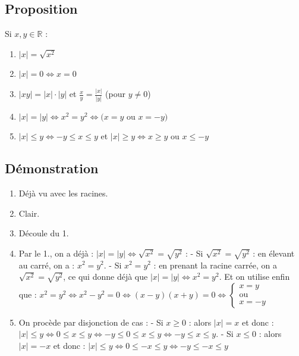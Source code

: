 \documentclass{article}
\begin{document}
	\subsection{Proposition }
	Si $x, y \in \mathbb{R}$ :
	\begin{enumerate}
		\item $|x| = \sqrt{x^2}$
		\item $|x| = 0 \Leftrightarrow x = 0$
		\item $|xy| = |x| \cdot |y|$ et $\frac{x}{y} = \frac{|x|}{|y|}$ (pour $y \neq 0$)
		\item $|x| = |y| \Leftrightarrow x^2 = y^2 \Leftrightarrow (x = y$ ou $x = -y)$
		\item $|x| \leq y \Leftrightarrow -y \leq x \leq y$ et $|x| \geq y \Leftrightarrow x \geq y$ ou $x \leq -y$
	\end{enumerate}
	
	\subsection{Démonstration}
	\begin{enumerate}
		\item Déjà vu avec les racines.
		\item Clair.
		\item Découle du 1.
		\item Par le 1., on a déjà : $|x| = |y| \Leftrightarrow \sqrt{x^2} = \sqrt{y^2}$ :
		- Si $\sqrt{x^2} = \sqrt{y^2}$ : en élevant au carré, on a : $x^2 = y^2$.
		- Si $x^2 = y^2$ : en prenant la racine carrée, on a $\sqrt{x^2} = \sqrt{y^2}$, ce qui donne déjà que $|x| = |y| \Leftrightarrow x^2 = y^2$. Et on utilise enfin que :
		$x^2 = y^2 \Leftrightarrow x^2 - y^2 = 0 \Leftrightarrow (x - y)(x + y) = 0 \Leftrightarrow
		\begin{cases}
			x = y \\
			\text{ou} \\
			x = -y
		\end{cases}$
		\item On procède par disjonction de cas : \newline
		- Si $x \geq 0$ : alors $|x| = x$ et donc : 
		$|x| \leq y \Leftrightarrow 0 \leq x \leq y \Leftrightarrow -y \leq 0 \leq x \leq y \Leftrightarrow -y \leq x \leq y$. \newline
		- Si $x \leq 0$ : alors $|x| = -x$ et donc :
		$|x| \leq y \Leftrightarrow 0 \leq -x \leq y \Leftrightarrow -y \leq -x \leq y$
	\end{enumerate}
\end{document}
